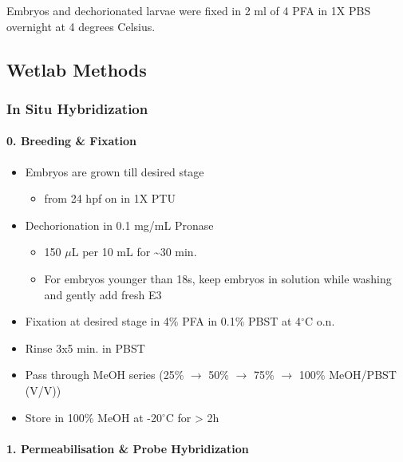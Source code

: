 \documentclass[11pt,singlespacinge,twoside]{reedthesis} %
\providecommand{\tightlist}{%
  \setlength{\itemsep}{0pt}\setlength{\parskip}{0pt}}
\begin{document}
Embryos and dechorionated larvae were fixed in 2 ml of 4 PFA in 1X PBS overnight at 4 degrees Celsius.

\hypertarget{Wet-met}{%
\subsection{Wetlab Methods}\label{Wet-met}}

\hypertarget{ISH-met}{%
\subsubsection{In Situ Hybridization}\label{ISH-met}}

\hypertarget{breeding-fixation}{%
\paragraph{0. Breeding \& Fixation}\label{breeding-fixation}}
\begin{itemize}
\tightlist
\item
  Embryos are grown till desired stage
  \begin{itemize}
  \tightlist
  \item
    from 24 hpf on in 1X PTU
  \end{itemize}
\item
  Dechorionation in 0.1 mg/mL Pronase
  \begin{itemize}
  \tightlist
  \item
    150 \(\mu\)L per 10 mL for \textasciitilde{}30 min.
  \item
    For embryos younger than 18s, keep embryos in solution while washing and gently add fresh E3
  \end{itemize}
\item
  Fixation at desired stage in 4\% PFA in 0.1\% PBST at 4\(^\circ\)C o.n.
\item
  Rinse 3x5 min. in PBST
\item
  Pass through MeOH series (25\% \(\rightarrow\) 50\% \(\rightarrow\) 75\% \(\rightarrow\) 100\% MeOH/PBST (V/V))
\item
  Store in 100\% MeOH at -20\(^\circ\)C for \textgreater{} 2h
\end{itemize}
\hypertarget{permeabilisation-probe-hybridization}{%
\paragraph{\texorpdfstring{1. Permeabilisation \& Probe Hybridization \newline \newline}{1. Permeabilisation \& Probe Hybridization }}\label{permeabilisation-probe-hybridization}}
\end{document}
